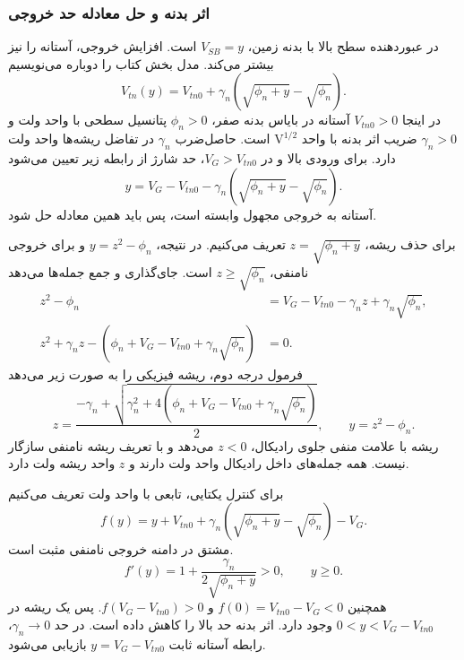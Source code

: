 \subsubsection{اثر بدنه و حل معادله حد خروجی}
\label{sec:pass-body-effect}
در  عبوردهنده سطح بالا با بدنه زمین،
\(V_{SB}=y\) است. افزایش خروجی، آستانه را نیز بیشتر می‌کند.
مدل بخش  کتاب را دوباره می‌نویسیم
\begin{equation}
 V_{tn}(y)=V_{tn0}+\gamma_n
       \left(\sqrt{\phi_n+y}-\sqrt{\phi_n}\right).
 \label{eq:pass-body-threshold}
\end{equation}
در اینجا \(V_{tn0}>0\) آستانه در بایاس بدنه صفر،
\(\phi_n>0\) پتانسیل سطحی با واحد ولت و
\(\gamma_n>0\) ضریب اثر بدنه با واحد
\(\unit{\volt}^{1/2}\) است.
حاصل‌ضرب \(\gamma_n\) در تفاضل ریشه‌ها واحد ولت دارد.
برای ورودی بالا و  در \(V_G>V_{tn0}\)، حد شارژ
از رابطه زیر تعیین می‌شود
\begin{equation}
 y=V_G-V_{tn0}-\gamma_n
       \left(\sqrt{\phi_n+y}-\sqrt{\phi_n}\right).
 \label{eq:pass-body-implicit}
\end{equation}
آستانه به خروجی مجهول وابسته است، پس باید همین معادله حل شود.

برای حذف ریشه، \(z=\sqrt{\phi_n+y}\) تعریف می‌کنیم.
در نتیجه، \(y=z^2-\phi_n\) و برای خروجی نامنفی،
\(z\ge\sqrt{\phi_n}\) است. جای‌گذاری و جمع جمله‌ها می‌دهد
\begin{align*}
 z^2-\phi_n&=V_G-V_{tn0}-\gamma_n z+\gamma_n\sqrt{\phi_n},\\
 z^2+\gamma_nz
  -\left(\phi_n+V_G-V_{tn0}+\gamma_n\sqrt{\phi_n}\right)&=0.
\end{align*}
فرمول درجه دوم، ریشه فیزیکی را به صورت زیر می‌دهد
\begin{equation}
 z=\frac{-\gamma_n+
 \sqrt{\gamma_n^2+4(\phi_n+V_G-V_{tn0}+\gamma_n\sqrt{\phi_n})}}{2},
 \qquad y=z^2-\phi_n.
 \label{eq:pass-body-root}
\end{equation}
ریشه با علامت منفی جلوی رادیکال، \(z<0\) می‌دهد و با
تعریف ریشه نامنفی سازگار نیست. همه جمله‌های داخل رادیکال
واحد ولت دارند و \(z\) واحد ریشه ولت دارد.

برای کنترل یکتایی، تابعی با واحد ولت تعریف می‌کنیم
\begin{equation}
 f(y)=y+V_{tn0}+\gamma_n
 (\sqrt{\phi_n+y}-\sqrt{\phi_n})-V_G.
 \label{eq:pass-body-residual}
\end{equation}
مشتق در دامنه خروجی نامنفی مثبت است.
\[
 f'(y)=1+\frac{\gamma_n}{2\sqrt{\phi_n+y}}>0,\qquad y\ge0.
\]
همچنین \(f(0)=V_{tn0}-V_G<0\) و
\(f(V_G-V_{tn0})>0\). پس یک ریشه در
\(0<y<V_G-V_{tn0}\) وجود دارد. اثر بدنه حد بالا را کاهش
داده است. در حد \(\gamma_n\to0\)، رابطه آستانه ثابت
\(y=V_G-V_{tn0}\) بازیابی می‌شود.

